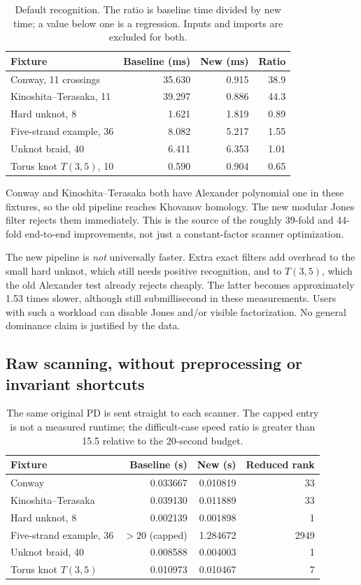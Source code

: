 \documentclass[11pt]{article}
\theoremstyle{definition}\newtheorem{definition}[theorem]{Definition}
\theoremstyle{remark}\newtheorem{remark}[theorem]{Remark}
\begin{document}
\begin{table}[htbp]
\centering
\begin{tabular}{@{}lrrr@{}}
\toprule
Fixture & Baseline (ms) & New (ms) & Ratio\\
\midrule
Conway, 11 crossings & 35.630 & 0.915 & 38.9\\
Kinoshita--Terasaka, 11 & 39.297 & 0.886 & 44.3\\
Hard unknot, 8 & 1.621 & 1.819 & 0.89\\
Five-strand example, 36 & 8.082 & 5.217 & 1.55\\
Unknot braid, 40 & 6.411 & 6.353 & 1.01\\
Torus knot $T(3,5)$, 10 & 0.590 & 0.904 & 0.65\\
\bottomrule
\end{tabular}
\caption{Default recognition. The ratio is baseline time divided by new time;
a value below one is a regression. Inputs and imports are excluded for both.}
\label{tab:pipeline}
\end{table}

Conway and Kinoshita--Terasaka both have Alexander polynomial one in these
fixtures, so the old pipeline reaches Khovanov homology. The new modular
Jones filter rejects them immediately. This is the source of the roughly
39-fold and 44-fold end-to-end improvements, not just a constant-factor
scanner optimization.

The new pipeline is \emph{not} universally faster. Extra exact filters add
overhead to the small hard unknot, which still needs positive recognition,
and to $T(3,5)$, which the old Alexander test already rejects cheaply. The
latter becomes approximately 1.53 times slower, although still submillisecond
in these measurements. Users with such a workload can disable Jones and/or
visible factorization. No general dominance claim is justified by the data.

\subsection{Raw scanning, without preprocessing or invariant shortcuts}

\begin{table}[htbp]
\centering
\begin{tabular}{@{}lrrr@{}}
\toprule
Fixture & Baseline (s) & New (s) & Reduced rank\\
\midrule
Conway & 0.033667 & 0.010819 & 33\\
Kinoshita--Terasaka & 0.039130 & 0.011889 & 33\\
Hard unknot, 8 & 0.002139 & 0.001898 & 1\\
Five-strand example, 36 & $>20$ (capped) & 1.284672 & 2949\\
Unknot braid, 40 & 0.008588 & 0.004003 & 1\\
Torus knot $T(3,5)$ & 0.010973 & 0.010467 & 7\\
\bottomrule
\end{tabular}
\caption{The same original PD is sent straight to each scanner. The capped
entry is not a measured runtime; the difficult-case speed ratio is greater
than 15.5 relative to the 20-second budget.}
\label{tab:scan}
\end{table}
\end{document}
